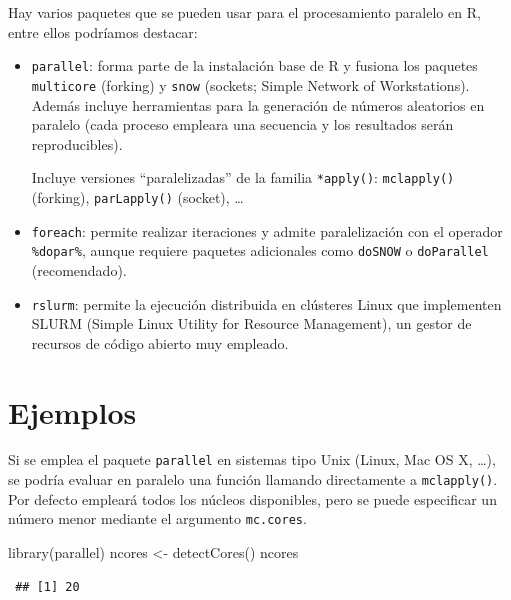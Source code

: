 \documentclass[
  10pt,
]{book}
\newenvironment{Shaded}{\begin{snugshade}}{\end{snugshade}}
\newcommand{\FunctionTok}[1]{\textcolor[rgb]{0.00,0.00,0.00}{#1}}
\newcommand{\NormalTok}[1]{#1}
\newcommand{\OtherTok}[1]{\textcolor[rgb]{0.56,0.35,0.01}{#1}}
\theoremstyle{break}
\theoremstyle{nonumberplain}
\begin{document}
Hay varios paquetes que se pueden usar para el procesamiento paralelo en R,
entre ellos podríamos destacar:

\begin{itemize}
\item
  \texttt{parallel}: forma parte de la instalación base de R y fusiona los paquetes \texttt{multicore} (forking) y \texttt{snow} (sockets; Simple Network of Workstations).
  Además incluye herramientas para la generación de números aleatorios en paralelo (cada proceso empleara una secuencia y los resultados serán reproducibles).

  Incluye versiones ``paralelizadas'' de la familia \texttt{*apply()}:
  \texttt{mclapply()} (forking), \texttt{parLapply()} (socket), \ldots{}
\item
  \texttt{foreach}: permite realizar iteraciones y admite paralelización con el operador \texttt{\%dopar\%}, aunque requiere paquetes adicionales como \texttt{doSNOW} o \texttt{doParallel} (recomendado).
\item
  \texttt{rslurm}: permite la ejecución distribuida en clústeres Linux que implementen SLURM (Simple Linux Utility for Resource Management), un gestor de recursos de código abierto muy empleado.
\end{itemize}

\hypertarget{ejemplos}{%
\section{Ejemplos}\label{ejemplos}}

Si se emplea el paquete \texttt{parallel} en sistemas tipo Unix (Linux, Mac OS X, \ldots), se podría evaluar en paralelo una función llamando directamente a \texttt{mclapply()}.
Por defecto empleará todos los núcleos disponibles, pero se puede especificar un número menor mediante el argumento \texttt{mc.cores}.

\begin{Shaded}
\begin{Highlighting}[]
\FunctionTok{library}\NormalTok{(parallel)}
\NormalTok{ncores }\OtherTok{\textless{}{-}} \FunctionTok{detectCores}\NormalTok{()}
\NormalTok{ncores}
\end{Highlighting}
\end{Shaded}

\begin{verbatim}
 ## [1] 20
\end{verbatim}
\end{document}

